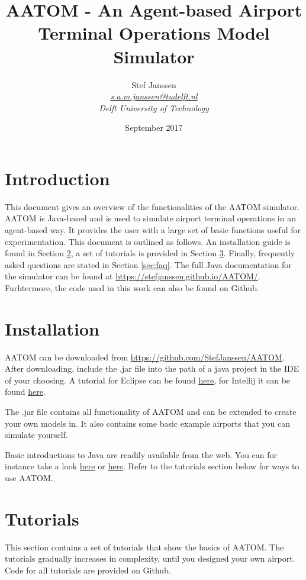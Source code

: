 \documentclass{article}
\title{AATOM - An Agent-based Airport Terminal Operations Model Simulator}
\author{Stef Janssen
\\\href{mailto:s.a.m.janssen@tudelft.nl}{\textit{s.a.m.janssen@tudelft.nl}}
\\\textit{Delft University of Technology}
}
\date{September 2017}
\begin{document}
\maketitle

\section{Introduction}
This document gives an overview of the functionalities of the AATOM simulator. AATOM is Java-based and is used to simulate airport terminal operations in an agent-based way. It provides the user with a large set of basic functions useful for experimentation. This document is outlined as follows. An installation guide is found in Section \ref{sec:installation}, a set of tutorials is provided in Section \ref{sec:tutorials}. Finally, frequently asked questions are stated in Section \ref{sec:faq}. The full Java documentation for the simulator can be found at \href{https://stefjanssen.github.io/AATOM/}{https://stefjanssen.github.io/AATOM/}. Furhtermore, the code used in this work can also be found on Github.

\section{Installation} \label{sec:installation}
AATOM can be downloaded from \href{https://github.com/StefJanssen/AATOM}{https://github.com/StefJanssen/AATOM}. After downloading, include the .jar file into the path of a java project in the IDE of your choosing. A tutorial for Eclipse can be found \href{https://stackoverflow.com/questions/3280353/how-to-import-a-jar-in-eclipse}{\underline{here}}, for Intellij it can be found \href{https://stackoverflow.com/questions/1051640/correct-way-to-add-external-jars-lib-jar-to-an-intellij-idea-project}{\underline{here}}. 

The .jar file contains all functionality of AATOM and can be extended to create your own models in. It also contains some basic example airports that you can simulate yourself.

Basic introductions to Java are readily available from the web. You can for instance take a look \href{https://www.tutorialspoint.com/java/}{here} or \href{http://math.hws.edu/javanotes/}{here}. Refer to the tutorials section below for ways to use AATOM.

\section{Tutorials} \label{sec:tutorials}
This section contains a set of tutorials that show the basics of AATOM. The tutorials gradually increases in complexity, until you designed your own airport. Code for all tutorials are provided on Github.
\end{document}
